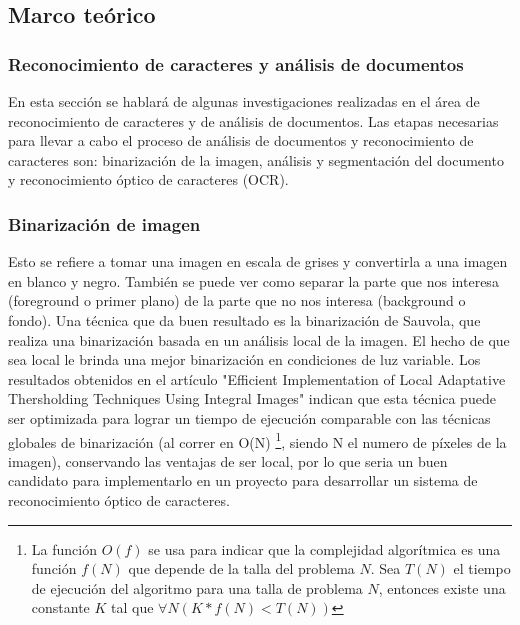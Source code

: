 \documentclass[a4paper, 11pt, oneside]{article}
\begin{document}
	\subsection {Marco teórico}
	\subsubsection{Reconocimiento de caracteres y análisis de documentos}
	En esta sección se hablará de algunas investigaciones realizadas en el área
	de reconocimiento de caracteres y de análisis de documentos.
	Las etapas necesarias para llevar a cabo el proceso de análisis de documentos
	y reconocimiento de caracteres son: binarización de la imagen, análisis y
	segmentación del documento y reconocimiento óptico de caracteres (OCR).
	
	\subsubsection{Binarización de imagen}
	Esto se refiere a tomar una imagen en escala de grises y convertirla a una 
	imagen en blanco y negro. También se puede ver como separar la parte que nos interesa
	(foreground o primer plano) de la parte que no nos interesa (background o fondo).
	Una técnica que da buen resultado es la binarización de Sauvola,
	que realiza una binarización basada en un análisis local de la imagen. El hecho de
	que sea local le brinda una mejor binarización en condiciones de luz variable. Los 
    resultados obtenidos en el artículo "Efficient Implementation of Local Adaptative 
    Thersholding Techniques Using Integral Images" indican que esta técnica puede ser
    optimizada para lograr un tiempo de ejecución comparable con las técnicas globales de 
    binarización (al correr en O(N) \footnote{La función $O(f)$ se usa para indicar que la complejidad
    algorítmica es una función $f(N)$ que depende de la talla del problema $N$. Sea $T(N)$ el tiempo de 
    ejecución del algoritmo para una talla de problema $N$, entonces existe una constante $K$ tal que 
    $\forall N ( K*f(N) < T(N) ) $}, siendo N el numero de píxeles de la imagen),
    conservando	las ventajas de ser local, por lo que seria un buen candidato para implementarlo en un 
    proyecto para desarrollar un sistema de reconocimiento óptico de caracteres.

	
\end{document}
